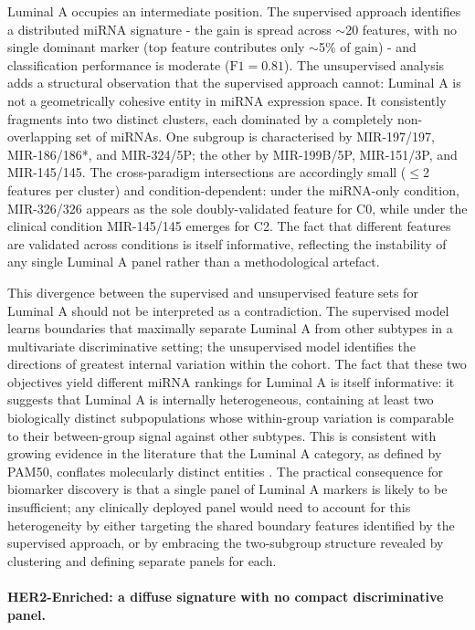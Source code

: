 Luminal A occupies an intermediate position. The supervised approach identifies a
distributed miRNA signature - the gain is spread across $\sim$20 features, with no
single dominant marker (top feature contributes only $\sim$5\% of gain) - and
classification performance is moderate ($\text{F1} = 0.81$). The unsupervised analysis
adds a structural observation that the supervised approach cannot: Luminal A is not a
geometrically cohesive entity in miRNA expression space. It consistently fragments into
two distinct clusters, each dominated by a completely non-overlapping set of miRNAs.
One subgroup is characterised by MIR-197/197, MIR-186/186*, and MIR-324/5P; the other
by MIR-199B/5P, MIR-151/3P, and MIR-145/145. The cross-paradigm intersections are
accordingly small ($\leq$2 features per cluster) and condition-dependent: under the
miRNA-only condition, MIR-326/326 appears as the sole doubly-validated feature for C0,
while under the clinical condition MIR-145/145 emerges for C2. The fact that different
features are validated across conditions is itself informative, reflecting the
instability of any single Luminal A panel rather than a methodological artefact.

This divergence between the supervised and unsupervised feature sets for Luminal A
should not be interpreted as a contradiction. The supervised model learns boundaries
that maximally separate Luminal A from other subtypes in a multivariate discriminative
setting; the unsupervised model identifies the directions of greatest internal variation
within the cohort. The fact that these two objectives yield different miRNA rankings
for Luminal A is itself informative: it suggests that Luminal A is internally
heterogeneous, containing at least two biologically distinct subpopulations whose
within-group variation is comparable to their between-group signal against other
subtypes. This is consistent with growing evidence in the literature that the Luminal A
category, as defined by PAM50, conflates molecularly distinct entities
\cite{bc_molecular_Perou2000}. The practical consequence for biomarker discovery is that
a single panel of Luminal A markers is likely to be insufficient; any clinically
deployed panel would need to account for this heterogeneity by either targeting the
shared boundary features identified by the supervised approach, or by embracing the
two-subgroup structure revealed by clustering and defining separate panels for each.

\paragraph{HER2-Enriched: a diffuse signature with no compact discriminative panel.}

